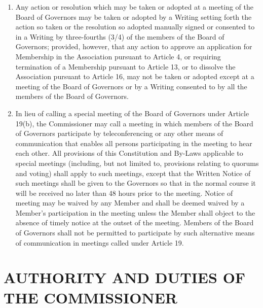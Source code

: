 \documentclass[]{book}
\providecommand{\tightlist}{%
  \setlength{\itemsep}{0pt}\setlength{\parskip}{0pt}}
\theoremstyle{definition}
\theoremstyle{definition}
\theoremstyle{definition}
\theoremstyle{remark}
\begin{document}
\begin{enumerate}
\def\labelenumi{(\alph{enumi})}
\tightlist
\item
  Any action or resolution which may be taken or adopted at a meeting of
  the Board of Governors may be taken or adopted by a Writing setting
  forth the action so taken or the resolution so adopted manually signed
  or consented to in a Writing by three-fourths (3/4) of the members of
  the Board of Governors; provided, however, that any action to approve
  an application for Membership in the Association pursuant to Article
  4, or requiring termination of a Membership pursuant to Article 13, or
  to dissolve the Association pursuant to Article 16, may not be taken
  or adopted except at a meeting of the Board of Governors or by a
  Writing consented to by all the members of the Board of Governors.
\item
  In lieu of calling a special meeting of the Board of Governors under
  Article 19(b), the Commissioner may call a meeting in which members of
  the Board of Governors participate by teleconferencing or any other
  means of communication that enables all persons participating in the
  meeting to hear each other. All provisions of this Constitution and
  By-Laws applicable to special meetings (including, but not limited to,
  provisions relating to quorums and voting) shall apply to such
  meetings, except that the Written Notice of such meetings shall be
  given to the Governors so that in the normal course it will be
  received no later than 48 hours prior to the meeting. Notice of
  meeting may be waived by any Member and shall be deemed waived by a
  Member's participation in the meeting unless the Member shall object
  to the absence of timely notice at the outset of the meeting. Members
  of the Board of Governors shall not be permitted to participate by
  such alternative means of communication in meetings called under
  Article 19.
\end{enumerate}

\section{AUTHORITY AND DUTIES OF THE
COMMISSIONER}\label{authority-and-duties-of-the-commissioner}
\end{document}
